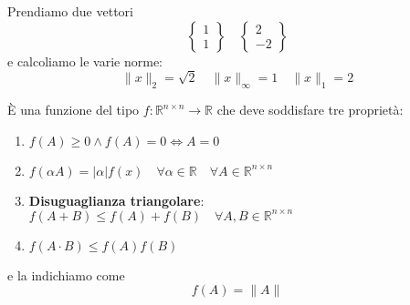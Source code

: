 \begin{example}
	Prendiamo due vettori
	\begin{equation*}
		\begin{Bmatrix}
			1 \\
			1
		\end{Bmatrix} \quad
		\begin{Bmatrix}
			2 \\
			-2
		\end{Bmatrix}
	\end{equation*}
	e calcoliamo le varie norme:
	\begin{equation*}
		\lVert x \rVert_2 = \sqrt{2} \quad \lVert x \rVert_\infty = 1 \quad \lVert x \rVert_1 = 2
	\end{equation*}
\end{example}

\begin{definition}
		È una funzione del tipo $f:\mathbb{R}^{n\times n} \to \mathbb{R}$ che deve soddisfare tre proprietà:
	\begin{enumerate}
		\item $f(A)\geq 0 \wedge f(A)=0 \Leftrightarrow A=0$
		\item $f(\alpha A)=\lvert \alpha \rvert f(x) \quad \forall \alpha \in \mathbb{R} \quad \forall A \in \mathbb{R}^{n\times n}$
		\item \textbf{Disuguaglianza triangolare}: $f(A+B)\leq f(A)+f(B) \quad \forall A,B \in \mathbb{R}^{n\times n}$
		\item $f(A\cdot B) \leq f(A) f(B)$
	\end{enumerate}
	e la indichiamo come
	\begin{equation*}
		f(A) = \lVert A \rVert
	\end{equation*}
\end{definition}